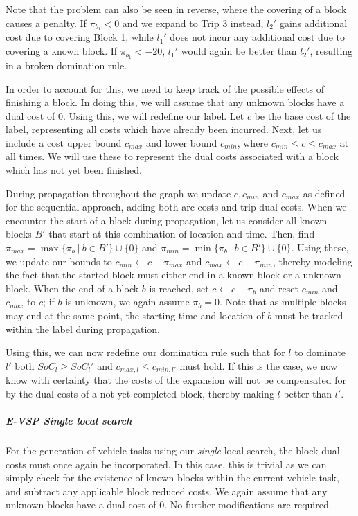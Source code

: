 \documentclass[]{article}
\begin{document}
Note that the problem can also be seen in reverse, where the covering of a block causes a penalty. If $\pi_{b_1} < 0$ and we expand to Trip 3 instead, $l_2'$ gains additional cost due to covering Block 1, while $l_1'$ does not incur any additional cost due to covering a known block. If $\pi_{b_1} < -20$, $l_1'$ would again be better than $l_2'$, resulting in a broken domination rule.  

In order to account for this, we need to keep track of the possible effects of finishing a block. In doing this, we will assume that any unknown blocks have a dual cost of 0. Using this, we will redefine our label. Let $c$ be the base cost of the label, representing all costs which have already been incurred. Next, let us include a cost upper bound $c_{max}$ and lower bound $c_{min}$, where $c_{min} \leq c \leq c_{max}$ at all times. We will use these to represent the dual costs associated with a block which has not yet been finished. 

During propagation throughout the graph we update $c, c_{min}$ and $c_{max}$ as defined for the sequential approach, adding both arc costs and trip dual costs. When we encounter the start of a block during propagation, let us consider all known blocks $B'$ that start at this combination of location and time. Then, find $\pi_{max} = \max \{ \pi_{b} \:|\: b \in B' \} \cup \{ 0 \}$ and $\pi_{min} = \min \{ \pi_{b} \:|\: b \in B' \} \cup \{ 0 \}$.  Using these, we update our bounds to $c_{min} \gets c - \pi_{max}$ and $c_{max} \gets c - \pi_{min}$, thereby modeling the fact that the started block must either end in a known block or a unknown block. When the end of a block $b$ is reached, set $c \gets c - \pi_b$ and reset $c_{min}$ and $c_{max}$ to $c$; if $b$ is unknown, we again assume $\pi_b = 0$. Note that as multiple blocks may end at the same point, the starting time and location of $b$ must be tracked within the label during propagation. 

Using this, we can now redefine our domination rule such that for $l$ to dominate $l'$ both $SoC_l \geq SoC_l'$ and $c_{max,l} \leq c_{min,l'}$ must hold. If this is the case, we now know with certainty that the costs of the expansion will not be compensated for by the dual costs of a not yet completed block, thereby making $l$ better than $l'$.

\subparagraph{E-VSP Single local search} For the generation of vehicle tasks using our \textit{single} local search, the block dual costs must once again be incorporated. In this case, this is trivial as we can simply check for the existence of known blocks within the current vehicle task, and subtract any applicable block reduced costs. We again assume that any unknown blocks have a dual cost of 0. No further modifications are required.
\end{document}
